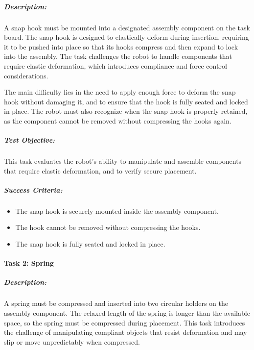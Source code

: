 \documentclass[letterpaper,10pt,english]{sphinxmanual}
\let\sphinxpxdimen\pdfpxdimen\else\newdimen\sphinxpxdimen
\begin{document}
\subparagraph{Description:}
\label{\detokenize{robotic_instructions_elastic_deformation:description}}
\sphinxAtStartPar
A snap hook must be mounted into a designated assembly component on the task board.
The snap hook is designed to elastically deform during insertion,
requiring it to be pushed into place so that its hooks compress and then expand to lock into the assembly.
The task challenges the robot to handle components that require elastic deformation, which introduces compliance and force control considerations.

\sphinxAtStartPar
The main difficulty lies in the need to apply enough force to deform the snap hook without damaging it,
and to ensure that the hook is fully seated and locked in place. The robot must also recognize when the snap hook is properly retained,
as the component cannot be removed without compressing the hooks again.

\noindent{\hspace*{\fill}\sphinxincludegraphics[width=400\sphinxpxdimen]{{snap_hook_placement_finished}.png}\hspace*{\fill}}


\subparagraph{Test Objective:}
\label{\detokenize{robotic_instructions_elastic_deformation:test-objective}}
\sphinxAtStartPar
This task evaluates the robot’s ability to manipulate and assemble components that require elastic deformation, and to verify secure placement.


\subparagraph{Success Criteria:}
\label{\detokenize{robotic_instructions_elastic_deformation:success-criteria}}\begin{itemize}
\item {} 
\sphinxAtStartPar
The snap hook is securely mounted inside the assembly component.

\item {} 
\sphinxAtStartPar
The hook cannot be removed without compressing the hooks.

\item {} 
\sphinxAtStartPar
The snap hook is fully seated and locked in place.

\end{itemize}


\paragraph{Task 2: Spring}
\label{\detokenize{robotic_instructions_elastic_deformation:task-2-spring}}

\subparagraph{Description:}
\label{\detokenize{robotic_instructions_elastic_deformation:id1}}
\sphinxAtStartPar
A spring must be compressed and inserted into two circular holders on the assembly component. The relaxed length of the spring is longer than the available space, so the spring must be compressed during placement. This task introduces the challenge of manipulating compliant objects that resist deformation and may slip or move unpredictably when compressed.
\end{document}
